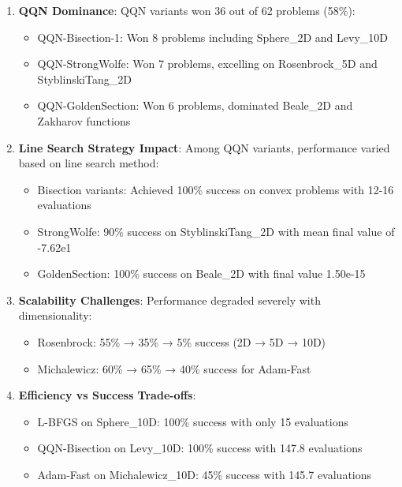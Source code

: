 \begin{enumerate}
\def\labelenumi{\arabic{enumi}.}
\tightlist
\item
  \textbf{QQN Dominance}: QQN variants won 36 out of 62 problems (58\%):

  \begin{itemize}
  \tightlist
  \item
    QQN-Bisection-1: Won 8 problems including Sphere\_2D and Levy\_10D
  \item
    QQN-StrongWolfe: Won 7 problems, excelling on Rosenbrock\_5D and StyblinskiTang\_2D
  \item
    QQN-GoldenSection: Won 6 problems, dominated Beale\_2D and Zakharov functions
  \end{itemize}
\item
  \textbf{Line Search Strategy Impact}: Among QQN variants, performance varied based on line search method:

  \begin{itemize}
  \tightlist
  \item
    Bisection variants: Achieved 100\% success on convex problems with 12-16 evaluations
  \item
    StrongWolfe: 90\% success on StyblinskiTang\_2D with mean final value of -7.62e1
  \item
    GoldenSection: 100\% success on Beale\_2D with final value 1.50e-15
  \end{itemize}
\item
  \textbf{Scalability Challenges}: Performance degraded severely with dimensionality:

  \begin{itemize}
  \tightlist
  \item
    Rosenbrock: 55\% → 35\% → 5\% success (2D → 5D → 10D)
  \item
    Michalewicz: 60\% → 65\% → 40\% success for Adam-Fast
  \end{itemize}
\item
  \textbf{Efficiency vs Success Trade-offs}:

  \begin{itemize}
  \tightlist
  \item
    L-BFGS on Sphere\_10D: 100\% success with only 15 evaluations
  \item
    QQN-Bisection on Levy\_10D: 100\% success with 147.8 evaluations
  \item
    Adam-Fast on Michalewicz\_10D: 45\% success with 145.7 evaluations
  \end{itemize}
\end{enumerate}

